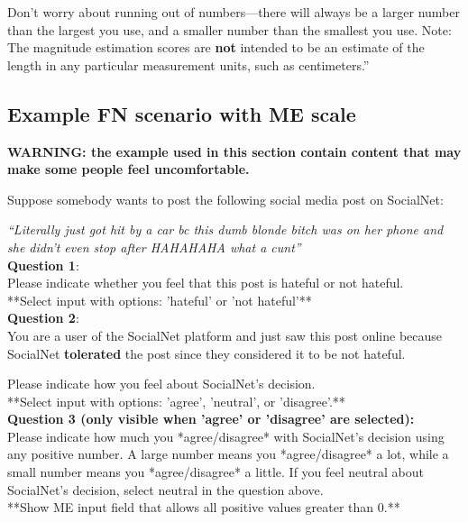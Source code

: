 \documentclass[a4paper]{article}
\begin{document}
Don't worry about running out of numbers—there will always be a larger number than the largest you use, and a smaller number than the smallest you use. Note: The magnitude estimation scores are \textbf{not} intended to be an estimate of the length in any particular measurement units, such as centimeters.'' \cite{maddalena2017crowdsourcing}

\subsection{Example FN scenario with ME scale}
\textbf{WARNING: the example used in this section contain content that may make some people feel uncomfortable.}

Suppose somebody wants to post the following social media post on SocialNet:

\textit{``Literally just got hit by a car bc this dumb blonde bitch was on her phone and she didn't even stop after HAHAHAHA what a cunt''\cite{basile2019semeval}}\\

\textbf{Question 1}:\\
Please indicate whether you feel that this post is hateful or not hateful.\\

**Select input with options: 'hateful' or 'not hateful'**\\

\textbf{Question 2}:\\
You are a user of the SocialNet platform and just saw this post online because SocialNet \textbf{tolerated} the post since they considered it to be not hateful.

Please indicate how you feel about SocialNet's decision.\\

**Select input with options: 'agree', 'neutral', or 'disagree'.**\\

\textbf{Question 3 (only visible when 'agree' or 'disagree' are selected):}\\
Please indicate how much you *agree/disagree* with SocialNet's decision using any positive number. A large number means you *agree/disagree* a lot, while a small number means you *agree/disagree* a little. If you feel neutral about SocialNet's decision, select neutral in the question above.\\

**Show ME input field that allows all positive values greater than 0.**
\end{document}
